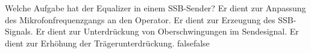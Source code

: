     {Welche Aufgabe hat der Equalizer in einem SSB-Sender?}
    {Er dient zur Anpassung des Mikrofonfrequenzgangs an den Operator.}
    {Er dient zur Erzeugung des SSB-Signals.}
    {Er dient zur Unterdrückung von Oberschwingungen im Sendesignal.}
    {Er dient zur Erhöhung der Trägerunterdrückung.}
    {false}{false}